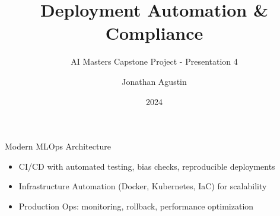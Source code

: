 \documentclass[aspectratio=169]{beamer}
\title{Deployment Automation \& Compliance}
\subtitle{AI Masters Capstone Project - Presentation 4}
\author{Jonathan Agustin}
\date{2024}
\begin{document}


\maketitle


\begin{frame}{Modern MLOps Architecture}


\begin{itemize}
\item CI/CD with automated testing, bias checks, reproducible deployments
\item Infrastructure Automation (Docker, Kubernetes, IaC) for scalability
\item Production Ops: monitoring, rollback, performance optimization
\end{itemize}
\end{frame}

\end{document}
